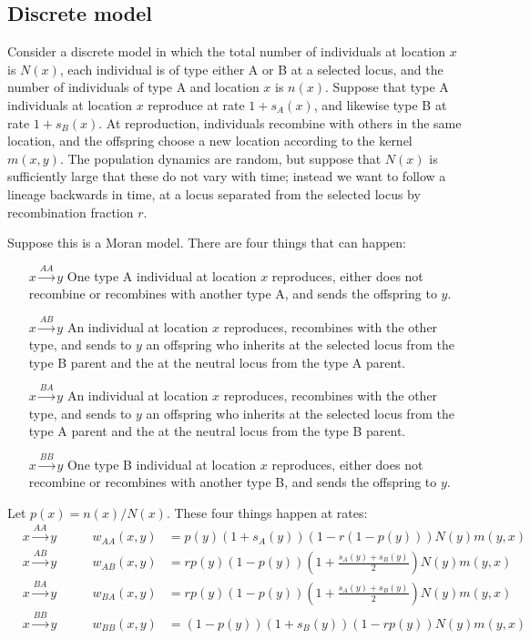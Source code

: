 \documentclass{article}
\begin{document}
\subsection{Discrete model}

Consider a discrete model in which the total number of individuals at location $x$ is $N(x)$,
each individual is of type either A or B at a selected locus,
and the number of individuals of type A and location $x$ is $n(x)$.
Suppose that type A individuals at location $x$ reproduce at rate $1+s_A(x)$, 
and likewise type B at rate $1+s_B(x)$.
At reproduction, individuals recombine with others in the same location,
and the offspring choose a new location according to the kernel $m(x,y)$.
The population dynamics are random, but suppose that $N(x)$ is sufficiently large that these do not vary with time;
instead we want to follow a lineage backwards in time,
at a locus separated from the selected locus by recombination fraction $r$.

Suppose this is a Moran model.
There are four things that can happen:
\begin{enumerate}
    \item[$x\xrightarrow{AA}y$] One type A individual at location $x$ reproduces, 
        either does not recombine or recombines with another type A,
        and sends the offspring to $y$.
    \item[$x\xrightarrow{AB}y$] An individual at location $x$ reproduces, 
        recombines with the other type,
        and sends to $y$ an offspring
        who inherits at the selected locus from the type B parent 
        and the at the neutral locus from the type A parent.
    \item[$x\xrightarrow{BA}y$] An individual at location $x$ reproduces, 
        recombines with the other type,
        and sends to $y$ an offspring
        who inherits at the selected locus from the type A parent 
        and the at the neutral locus from the type B parent.
    \item[$x\xrightarrow{BB}y$] One type B individual at location $x$ reproduces, 
        either does not recombine or recombines with another type B,
        and sends the offspring to $y$.
\end{enumerate}
Let $p(x) = n(x)/N(x)$.
These four things happen at rates:
\begin{align}
    & x\xrightarrow{AA}y & \qquad w_{AA}(x,y) &= p(y) (1+s_A(y)) \left(1 - r (1-p(y)) \right)  N(y) m(y,x) \\
    & x\xrightarrow{AB}y & \qquad w_{AB}(x,y) &= r p(y) (1-p(y)) \left(1+\frac{s_A(y)+s_B(y)}{2}\right) N(y) m(y,x) \\
    & x\xrightarrow{BA}y & \qquad w_{BA}(x,y) &= r p(y) (1-p(y)) \left(1+\frac{s_A(y)+s_B(y)}{2}\right) N(y) m(y,x) \\
    & x\xrightarrow{BB}y & \qquad w_{BB}(x,y) &= (1-p(y)) (1+s_B(y)) \left(1 - r p(y) \right) N(y) m(y,x) 
\end{align}
\end{document}
